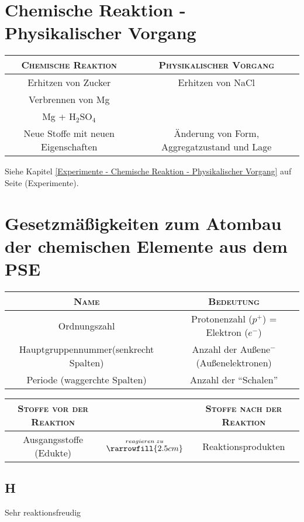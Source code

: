\section{Chemische Reaktion - Physikalischer Vorgang}
\begin{longtable}{|c|c|}
\hline \textsc{Chemische Reaktion} & \textsc{Physikalischer Vorgang} \\
\hline Erhitzen von Zucker & Erhitzen von NaCl \\
Verbrennen von Mg &  \\
Mg + H$_{2}$SO$_{4}$ &  \\
\hline Neue Stoffe mit neuen Eigenschaften & Änderung von Form, Aggregatzustand und Lage \\
\hline
\end{longtable}

Siehe Kapitel \ref{Experimente - Chemische Reaktion - Physikalischer Vorgang} auf
Seite \pageref{Experimente - Chemische Reaktion - Physikalischer Vorgang} (Experimente).
\section{Gesetzmäßigkeiten zum Atombau der chemischen Elemente aus dem PSE}
\begin{longtable}{|c|c|}
\hline \textsc{Name} & \textsc{Bedeutung} \\
\hline Ordnungszahl & Protonenzahl ($p^+$) = Elektron ($e^-$) \\
\hline Hauptgruppennummer\;(senkrecht\; Spalten) & Anzahl der Außene$^-$ (Außenelektronen) \\
\hline Periode (waggerchte Spalten) & Anzahl der \enquote{Schalen} \\
\hline
\end{longtable}

\begin{longtable}{|ccc|}
\hline \textsc{Stoffe vor der Reaktion} && \textsc{Stoffe nach der Reaktion} \\
\hline Ausgangsstoffe (Edukte) & $\stackrel{reagieren\;zu}{\rarrowfill{2.5cm}}$ & Reaktionsprodukten \\
\hline
\end{longtable}

\subsection{\acf{H}}
Sehr reaktionsfreudig
